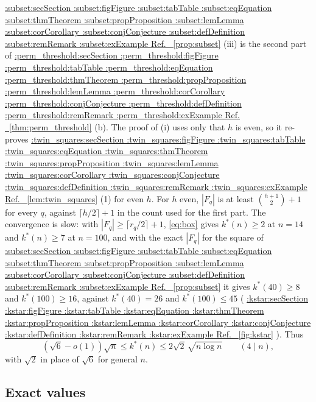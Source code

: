 \documentclass[11pt,a4paper]{article}
\makeatletter
\def\Cref@getprefix#1:#2\relax{#1}
\def\Cref@prefix@sec{sec}
\def\Cref@prefix@fig{fig}
\def\Cref@prefix@tab{tab}
\def\Cref@prefix@eq{eq}
\def\Cref@prefix@thm{thm}
\def\Cref@prefix@prop{prop}
\def\Cref@prefix@lem{lem}
\def\Cref@prefix@cor{cor}
\def\Cref@prefix@conj{conj}
\def\Cref@prefix@def{def}
\def\Cref@prefix@rem{rem}
\def\Cref@prefix@ex{ex}
\def\Cref@type@cap#1{%
  \edef\Cref@tmp{#1}%
  \ifx\Cref@tmp\Cref@prefix@sec Section%
  \else\ifx\Cref@tmp\Cref@prefix@fig Figure%
  \else\ifx\Cref@tmp\Cref@prefix@tab Table%
  \else\ifx\Cref@tmp\Cref@prefix@eq Equation%
  \else\ifx\Cref@tmp\Cref@prefix@thm Theorem%
  \else\ifx\Cref@tmp\Cref@prefix@prop Proposition%
  \else\ifx\Cref@tmp\Cref@prefix@lem Lemma%
  \else\ifx\Cref@tmp\Cref@prefix@cor Corollary%
  \else\ifx\Cref@tmp\Cref@prefix@conj Conjecture%
  \else\ifx\Cref@tmp\Cref@prefix@def Definition%
  \else\ifx\Cref@tmp\Cref@prefix@rem Remark%
  \else\ifx\Cref@tmp\Cref@prefix@ex Example%
  \else Ref.%
  \fi\fi\fi\fi\fi\fi\fi\fi\fi\fi\fi\fi
}
\DeclareRobustCommand{\Cref}[1]{%
  \begingroup
  \edef\Cref@label{#1}%
  \edef\Cref@prefix{\expandafter\Cref@getprefix\Cref@label:\relax}%
  \hyperref[#1]{\Cref@type@cap{\Cref@prefix}~\ref*{#1}}%
  \endgroup
}
\theoremstyle{plain}
\theoremstyle{definition}
\theoremstyle{remark}
\makeatother
\begin{document}
\Cref{prop:subset}(iii) is the second part of \Cref{thm:perm_threshold}(b).
The proof of (i) uses only that $h$ is even, so it re-proves \Cref{lem:twin_squares}(1) for even $h$.
For $h$ even, $|F_q|$ is at least $\binom{h+1}2+1$ for every $q$, against $\lceil h/2\rceil+1$ in the count used for the first part.
The convergence is slow: with $|F_q|\ge\lceil r_q/2\rceil+1$, \eqref{eq:box} gives $k^*(n)\ge2$ at $n=14$ and $k^*(n)\ge7$ at $n=100$, and with the exact $|F_q|$ for the square of \Cref{prop:subset} it gives $k^*(40)\ge8$ and $k^*(100)\ge16$, against $k^*(40)=26$ and $k^*(100)\le45$ (\Cref{fig:kstar}).
Thus
\[
(\sqrt6-o(1))\sqrt n\le k^*(n)\le2\sqrt2\,\sqrt{n\log n}\qquad(4\mid n),
\]
with $\sqrt2$ in place of $\sqrt6$ for general $n$.

\subsection{Exact values}
\label{sec:kstar_exact}
\end{document}
